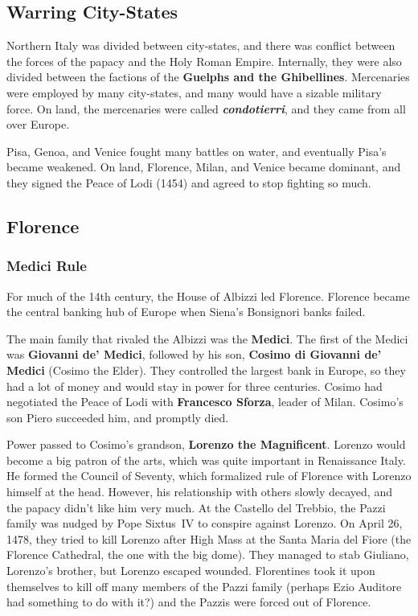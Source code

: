 \subsection*{Warring City-States}

Northern Italy was divided between city-states,
and there was conflict between the forces of the papacy and the Holy Roman Empire.
Internally, they were also divided between the factions of the \textbf{Guelphs and the Ghibellines}.
Mercenaries were employed by many city-states, and many would have a sizable military force.
On land, the mercenaries were called \textit{\textbf{condotierri}},
and they came from all over Europe.

Pisa, Genoa, and Venice fought many battles on water, and eventually Pisa's became weakened.
On land, Florence, Milan, and Venice became dominant,
and they signed the Peace of Lodi (1454) and agreed to stop fighting so much.

\subsection*{Florence}

\subsubsection*{Medici Rule}

For much of the 14th century, the House of Albizzi led Florence.
Florence became the central banking hub of Europe when Siena's Bonsignori banks failed.

The main family that rivaled the Albizzi was the \textbf{Medici}.
The first of the Medici was \textbf{Giovanni de' Medici},
followed by his son, \textbf{Cosimo di Giovanni de' Medici} (Cosimo the Elder).
They controlled the largest bank in Europe,
so they had a lot of money and would stay in power for three centuries.
Cosimo had negotiated the Peace of Lodi with \textbf{Francesco Sforza}, leader of Milan.
Cosimo's son Piero succeeded him, and promptly died.

Power passed to Cosimo's grandson, \textbf{Lorenzo the Magnificent}.
Lorenzo would become a big patron of the arts, which was quite important in Renaissance Italy.
He formed the Council of Seventy,
which formalized rule of Florence with Lorenzo himself at the head.
However, his relationship with others slowly decayed, and the papacy didn't like him very much.
At the Castello del Trebbio,
the Pazzi family was nudged by Pope Sixtus~IV to conspire against Lorenzo.
On April 26, 1478, they tried to kill Lorenzo after High Mass at the Santa Maria del Fiore
(the Florence Cathedral, the one with the big dome).
They managed to stab Giuliano, Lorenzo's brother, but Lorenzo escaped wounded.
Florentines took it upon themselves to kill off many members of the Pazzi family
(perhaps Ezio Auditore had something to do with it?)
and the Pazzis were forced out of Florence.

